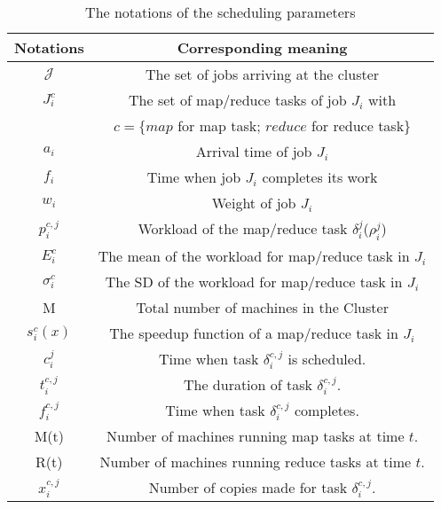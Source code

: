 \documentclass[10pt,conference,compsocconf,letterpaper]{IEEEtran}
\begin{document}
\begin{table}
\centering
\caption{The notations of the scheduling parameters}
\label{Table_1}
\begin{tabular}{|c|c|}
  \hline
  Notations &  Corresponding meaning\\
  \hline
  \hline
  $\mathcal{J}$ & The set of jobs arriving at the cluster\\
  \hline
  $J_i^c$ & The set of map/reduce tasks of job $J_i$ with \\
  & $c=\{map$ for map task; $reduce$ for reduce task\}\\
  \hline
  $a_i$ & Arrival time of job $J_i$\\
  \hline
  $f_i$ & Time when job $J_i$  completes its work \\
  \hline
  $w_{i}$ & Weight of job $J_i$\\
  \hline
  $p_i^{c,j}$ & Workload of the map/reduce task $\delta_i^j$($\rho_i^j$)\\
  \hline
  $E^c_i$ & The mean of the workload for map/reduce task in $J_i$\\
  \hline
  $\sigma^c_i$ & The SD of the workload for map/reduce task in $J_i$\\
  \hline
  M & Total number of machines in the Cluster\\
  \hline
  $s^c_i(x)$  & The speedup function of a map/reduce task in $J_i$\\
  \hline
  $c^{j}_{i}$  & Time when task $\delta^{{c,j}}_{i}$ is scheduled.\\
  \hline
   $t^{c,j}_{i}$  & The duration of task $\delta^{{c,j}}_{i}$.\\
  \hline
  $f^{c,j}_{i}$ & Time when task $\delta^{{c,j}}_{i}$ completes.\\
  \hline
  M(t) & Number of machines running map tasks at time $t$.\\
  \hline
  R(t) & Number of machines running reduce tasks at time $t$.\\
  \hline
  $x^{c,j}_{i}$ & Number of copies made for task $\delta^{{c,j}}_{i}$.\\
  \hline
\end{tabular}
\end{table}
\end{document}

